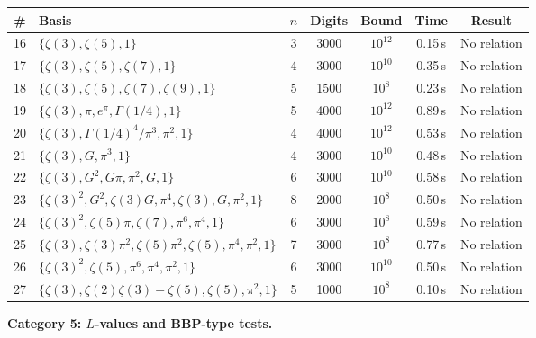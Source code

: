 \documentclass[12pt]{article}
\theoremstyle{definition}
\theoremstyle{remark}
\begin{document}
\begin{center}
\begin{tabular}{@{}clccccc@{}}
\toprule
\# & Basis & $n$ & Digits & Bound & Time & Result \\
\midrule
16 & $\{\zeta(3),\zeta(5),1\}$ & 3 & 3000 & $10^{12}$ & 0.15\,s & No relation \\
17 & $\{\zeta(3),\zeta(5),\zeta(7),1\}$ & 4 & 3000 & $10^{10}$ & 0.35\,s & No relation \\
18 & $\{\zeta(3),\zeta(5),\zeta(7),\zeta(9),1\}$ & 5 & 1500 & $10^{8}$ & 0.23\,s & No relation \\
19 & $\{\zeta(3),\pi,e^\pi,\Gamma(1/4),1\}$ & 5 & 4000 & $10^{12}$ & 0.89\,s & No relation \\
20 & $\{\zeta(3),\Gamma(1/4)^4/\pi^3,\pi^2,1\}$ & 4 & 4000 & $10^{12}$ & 0.53\,s & No relation \\
21 & $\{\zeta(3),G,\pi^3,1\}$ & 4 & 3000 & $10^{10}$ & 0.48\,s & No relation \\
22 & $\{\zeta(3),G^2,G\pi,\pi^2,G,1\}$ & 6 & 3000 & $10^{10}$ & 0.58\,s & No relation \\
23 & $\{\zeta(3)^2,G^2,\zeta(3)G,\pi^4,\zeta(3),G,\pi^2,1\}$ & 8 & 2000 & $10^{8}$ & 0.50\,s & No relation \\
24 & $\{\zeta(3)^2,\zeta(5)\pi,\zeta(7),\pi^6,\pi^4,1\}$ & 6 & 3000 & $10^{8}$ & 0.59\,s & No relation \\
25 & $\{\zeta(3),\zeta(3)\pi^2,\zeta(5)\pi^2,\zeta(5),\pi^4,\pi^2,1\}$ & 7 & 3000 & $10^{8}$ & 0.77\,s & No relation \\
26 & $\{\zeta(3)^2,\zeta(5),\pi^6,\pi^4,\pi^2,1\}$ & 6 & 3000 & $10^{10}$ & 0.50\,s & No relation \\
27 & $\{\zeta(3),\zeta(2)\zeta(3){-}\zeta(5),\zeta(5),\pi^2,1\}$ & 5 & 1000 & $10^{8}$ & 0.10\,s & No relation \\
\bottomrule
\end{tabular}
\end{center}


\medskip\noindent\textbf{Category 5: $L$-values and BBP-type tests.}
\end{document}
